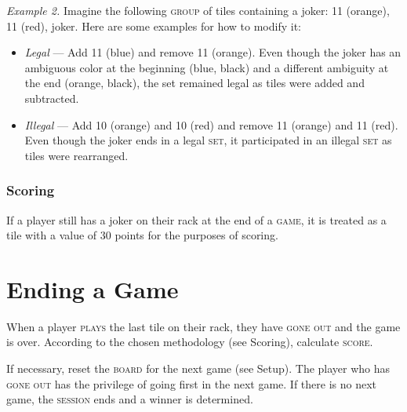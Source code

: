 \documentclass{article}
\begin{document}
\begin{multicols*}{3}
\noindent\textit{Example 2.} Imagine the following \textsc{group} of tiles
containing a joker: 11 (orange), 11 (red), joker. Here are some examples for how
to modify it:

\begin{itemize}
	\item \textit{Legal} --- Add 11 (blue) and remove 11 (orange). Even
		though the joker has an ambiguous color at the beginning (blue,
		black) and a different ambiguity at the end (orange, black), the
		set remained legal as tiles were added and subtracted.
	\item \textit{Illegal} --- Add 10 (orange) and 10 (red) and remove 11
		(orange) and 11 (red). Even though the joker ends in a legal
		\textsc{set}, it participated in an illegal \textsc{set} as
		tiles were rearranged.
\end{itemize}

\subsubsection*{Scoring}

If a player still has a joker on their rack at the end of a \textsc{game}, it is
treated as a tile with a value of 30 points for the purposes of scoring.

\section*{Ending a Game}

When a player \textsc{plays} the last tile on their rack, they have \textsc{gone
out} and the game is over. According to the chosen methodology (see Scoring),
calculate \textsc{score}.

If necessary, reset the \textsc{board} for the next game (see Setup). The player
who has \textsc{gone out} has the privilege of going first in the next game. If
there is no next game, the \textsc{session} ends and a winner is determined.

\end{multicols*}
\end{document}
